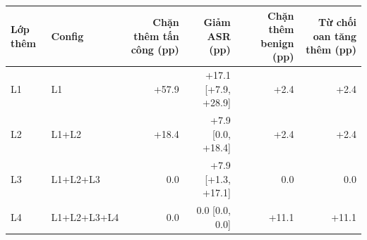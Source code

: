 \begin{tabular}{llrrrr}
\toprule
Lớp thêm & Config & Chặn thêm tấn công (pp) & Giảm ASR (pp) & Chặn thêm benign (pp) & Từ chối oan tăng thêm (pp) \\
\midrule
L1 & L1 & +57.9 & +17.1 [+7.9, +28.9] & +2.4 & +2.4 \\
L2 & L1+L2 & +18.4 & +7.9 [0.0, +18.4] & +2.4 & +2.4 \\
L3 & L1+L2+L3 & 0.0 & +7.9 [+1.3, +17.1] & 0.0 & 0.0 \\
L4 & L1+L2+L3+L4 & 0.0 & 0.0 [0.0, 0.0] & +11.1 & +11.1 \\
\bottomrule
\end{tabular}
